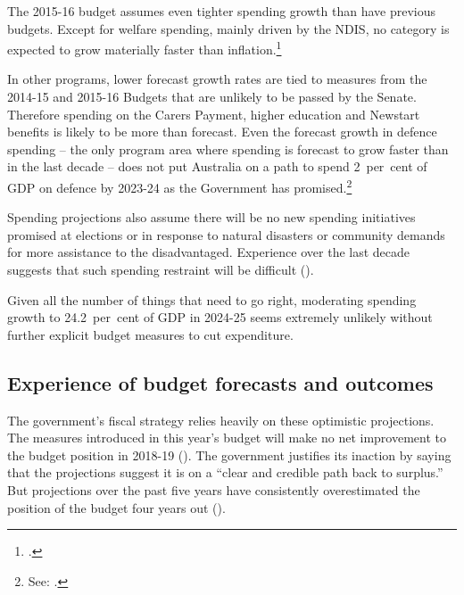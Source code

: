 \documentclass[twoside,english]{Dianab5ona4portrait}
\begin{document}
The 2015-16 budget assumes even tighter spending growth than have previous budgets. Except for welfare spending, mainly driven by the NDIS, no category is expected to grow materially faster than inflation.\footcite[][BP No.~1, pp.~5-11]{Treasury2015BudgetPapers201516}  

In other programs, lower forecast growth rates are tied to measures from the 2014-15 and 2015-16 Budgets that are unlikely to be passed by the Senate. Therefore spending on the Carers Payment, higher education and Newstart benefits is likely to be more than forecast\DEVIATION{}. Even the forecast growth in defence spending – the only program area where spending is forecast to grow faster than in the last decade – does not put Australia on a path to spend 2~per~cent of GDP on defence by 2023-24 as the Government has promised.\footnote{See: \textcite[][1]{Defence2014}.} 


Spending projections also assume there will be no new spending initiatives promised at elections or in response to natural disasters or community demands for more assistance to the disadvantaged. Experience over the last decade suggests that such spending restraint will be difficult ().

Given all the number of things that need to go right, moderating spending growth to 24.2~per~cent of GDP in 2024-25 seems extremely unlikely without further explicit budget measures to cut expenditure.

\subsection{Experience of budget forecasts and outcomes}\label{subsubsec:3-3-3}
The government’s fiscal strategy relies heavily on these optimistic projections. The measures introduced in this year’s budget will make no net improvement to the budget position in 2018-19 (). The government justifies its inaction by saying that the projections suggest it is on a “clear and credible path back to surplus.”  But projections over the past five years have consistently overestimated the position of the budget four years out (). 
\end{document}
